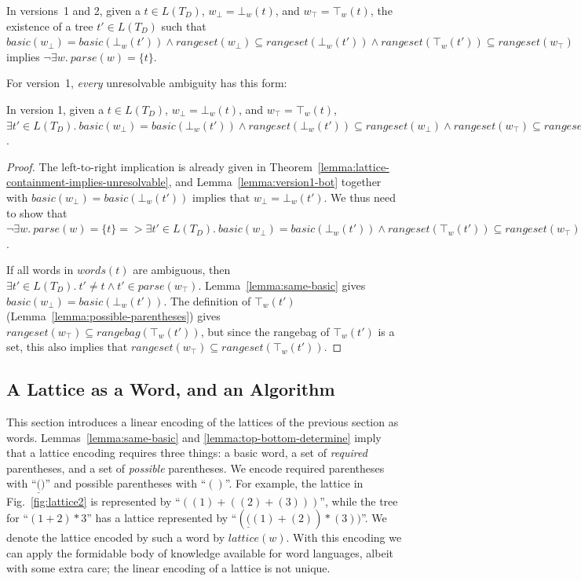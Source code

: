 \documentclass[acmsmall,review,anonymous]{acmart}\settopmatter{printfolios=true,printccs=false,printacmref=false}
\newcommand{\parse}{\mathit{parse}} %
\newcommand{\words}{\mathit{words}} %
\newcommand{\alt}{\mathit{alt}} %
\newcommand{\basic}{\mathit{basic}} %
\newcommand{\rangebag}{\mathit{rangebag}} %
\newcommand{\rangeset}{\mathit{rangeset}} %
\newcommand{\altset}{\mathit{altset}} %
\newcommand{\lattice}{\mathit{lattice}} %
\newcommand{\topw}{\top_w} %
\newcommand{\botw}{\bot_w} %
\newcommand{\reqpl}{\underline{(}}
\newcommand{\reqpr}{)}
\newcommand{\reqp}[1]{\reqpl#1\reqpr}
\newcommand{\pospl}{(}
\newcommand{\pospr}{)}
\newcommand{\posp}[1]{\pospl#1\pospr}
\begin{document}
\begin{theorem}
  In versions~1 and 2, given a $t \in L(T_D)$, $w_\bot = \botw(t)$, and $w_\top = \topw(t)$, the existence of a tree $t' \in L(T_D)$ such that $\basic(w_\bot) = \basic(\botw(t')) \land \rangeset(w_\bot) \subseteq \rangeset(\botw(t')) \land \rangeset(\topw(t')) \subseteq \rangeset(w_\top)$ implies $\neg \exists w.\ \parse(w) = \{t\}$. \label{lemma:lattice-containment-implies-unresolvable}
\end{theorem}


\noindent For version~1, \emph{every} unresolvable ambiguity has this form:

\begin{theorem}
  In version 1, given a $t \in L(T_D)$, $w_\bot = \botw(t)$, and $w_\top = \topw(t)$, $\exists t' \in L(T_D).\ \basic(w_\bot) = \basic(\botw(t')) \land \rangeset(\botw(t')) \subseteq \rangeset(w_\bot) \land \rangeset(w_\top) \subseteq \rangeset(\topw(t')) <=> \neg \exists w.\ \parse(w) = \{t\}$.
\end{theorem}

\begin{proof}
  The left-to-right implication is already given in Theorem~\ref{lemma:lattice-containment-implies-unresolvable}, and Lemma~\ref{lemma:version1-bot} together with $\basic(w_\bot) = \basic(\botw(t'))$ implies that $w_\bot = \botw(t')$. We thus need to show that $\neg \exists w.\ \parse(w) = \{t\} => \exists t' \in L(T_D).\ \basic(w_\bot) = \basic(\botw(t')) \land \rangeset(\topw(t')) \subseteq \rangeset(w_\top)$.

  If all words in $\words(t)$ are ambiguous, then $\exists t' \in L(T_D).\ t' \neq t \land t' \in \parse(w_\top)$. Lemma~\ref{lemma:same-basic} gives $\basic(w_\bot) = \basic(\botw(t'))$. The definition of $\topw(t')$ (Lemma~\ref{lemma:possible-parentheses}) gives $\rangeset(w_\top) \subseteq \rangebag(\topw(t'))$, but since the rangebag of $\topw(t')$ is a set, this also implies that $\rangeset(w_\top) \subseteq \rangeset(\topw(t'))$.
\end{proof}

\subsection{A Lattice as a Word, and an Algorithm} \label{sec:lattice-vpl}

This section introduces a linear encoding of the lattices of the previous section as words. Lemmas~\ref{lemma:same-basic} and \ref{lemma:top-bottom-determine} imply that a lattice encoding requires three things: a basic word, a set of \emph{required} parentheses, and a set of \emph{possible} parentheses. We encode required parentheses with ``$\reqp{}$'' and possible parentheses with ``$\posp{}$''. For example, the lattice in Fig.~\ref{fig:lattice2} is represented by ``$\posp{\posp{1} + \posp{\posp{2} + \posp{3}}}$'', while the tree for ``$(1 + 2) * 3$'' has a lattice represented by ``$\posp{\reqp{\posp{1} + \posp{2}} * \posp{3}}$''. We denote the lattice encoded by such a word by $\lattice(w)$. With this encoding we can apply the formidable body of knowledge available for word languages, albeit with some extra care; the linear encoding of a lattice is not unique.
\end{document}
